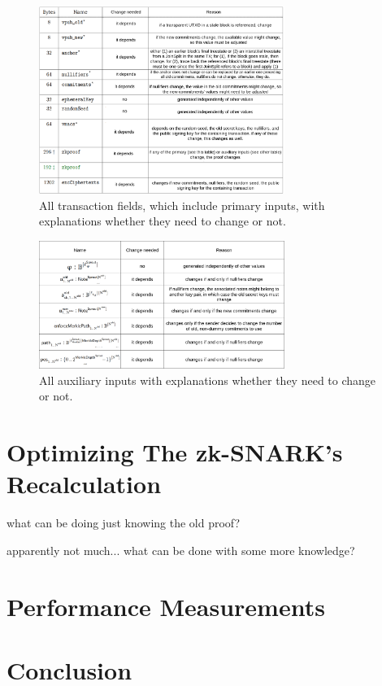 \documentclass{article}
\begin{document}
\begin{figure}[t]
\includegraphics[width=8cm]{images/transactionchange.png}
\caption{All transaction fields, which include primary inputs, with explanations whether they need to change or not.} \label{fig:joinsplit-change}
\centering
\end{figure}

\begin{figure}[t]
\includegraphics[width=8cm]{images/proofchange.png}
\caption{All auxiliary inputs with explanations whether they need to change or not.} \label{fig:proof-change}
\centering
\end{figure}

\section{Optimizing The zk-SNARK's Recalculation}

what can be doing just knowing the old proof?

apparently not much... what can be done with some more knowledge?

\section{Performance Measurements}

\section{Conclusion}
\end{document}
